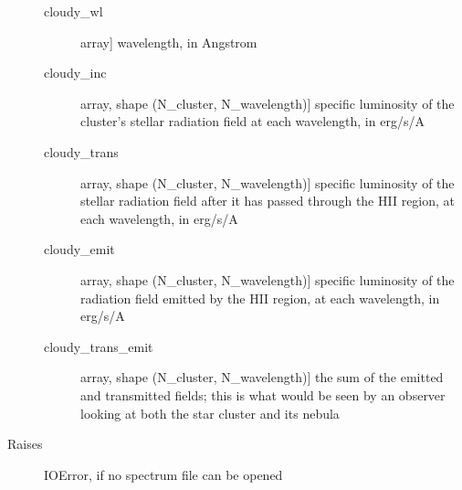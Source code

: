 \documentclass[letterpaper,10pt,english]{sphinxmanual}
\begin{document}
\begin{fulllineitems}
\begin{description}
\begin{description}
\item[{cloudy\_wl}] \leavevmode{[}array{]}
wavelength, in Angstrom

\item[{cloudy\_inc}] \leavevmode{[}array, shape (N\_cluster, N\_wavelength){]}
specific luminosity of the cluster’s stellar radiation field at
each wavelength, in erg/s/A

\item[{cloudy\_trans}] \leavevmode{[}array, shape (N\_cluster, N\_wavelength){]}
specific luminosity of the stellar radiation field after it has
passed through the HII region, at each wavelength, in erg/s/A

\item[{cloudy\_emit}] \leavevmode{[}array, shape (N\_cluster, N\_wavelength){]}
specific luminosity of the radiation field emitted by the HII
region, at each wavelength, in erg/s/A

\item[{cloudy\_trans\_emit}] \leavevmode{[}array, shape (N\_cluster, N\_wavelength){]}
the sum of the emitted and transmitted fields; this is what
would be seen by an observer looking at both the star cluster
and its nebula

\end{description}

\item[{Raises}] \leavevmode
IOError, if no spectrum file can be opened

\end{description}

\end{fulllineitems}

\end{document}
